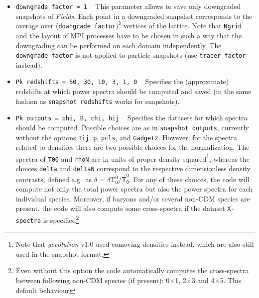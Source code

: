 \documentclass[a4paper,10pt]{article}
\begin{document}
\begin{itemize}
 If the particle template is a crystal only certain choices of \texttt{tracer factor} will result in a crystal structure for the
 \textit{tracer particles}. These are 1, 2, 8, 16, 64 for the simple cubic templates, 1, 4, 8, 32 for the face-centered cubic one,
 and 1, 2, 4, 16 for the body-centered cubic one.
 \item[] \hspace{-25pt}\texttt{downgrade factor = 1} ~ This parameter allows to save only downgraded snapshots of \textit{Fields}. Each
 point in a downgraded snapshot corresponds to the average over (\texttt{downgrade factor}$)^\mathsf{3}$ vertices of the lattice. Note that
 \texttt{Ngrid} and the layout of MPI processes have to be chosen in such a way that the downgrading can be performed on each domain
 independently. The \texttt{downgrade factor} is not applied to particle snapshots (use \texttt{tracer factor} instead).
 \item[] \hspace{-25pt}\texttt{Pk redshifts = 50, 30, 10, 3, 1, 0} ~ Specifies the (approximate) redshifts at which power spectra should be
 computed and saved (in the same fashion as \texttt{snapshot redshifts} works for snapshots).
 \item[] \hspace{-25pt}\texttt{Pk outputs = phi, B, chi, hij} ~ Specifies the datasets for which spectra should be computed. Possible
 choices are as in \texttt{snapshot outputs}, currently without the options \texttt{Tij}, \texttt{p}, \texttt{pcls}, and \texttt{Gadget2}.
 However, for the spectra related to densities there are two possible choices for the normalization. The spectra of \texttt{T00} and
 \texttt{rhoN} are in units of proper density squared\footnote{Note that \textit{gevolution} v1.0 used comoving densities instead, which are
 also still used in the snapshot format.}, whereas the choices \texttt{delta} and \texttt{deltaN} correspond to the respective dimensionless
 density contrasts, defined e.g.\ as $\mathsf{\delta}$ = $\mathsf{\delta}$T$^\mathsf{0}_\mathsf{0}$/$\mathsf{\bar{T}^0_0}$. For any of these
 choices, the code will compute not only the total power spectra but also the power spectra for each individual species. Moreover, if
 baryons and/or several non-CDM species are present, the code will 
also compute some cross-spectra if the dataset \texttt{X-spectra} is specified\footnote{Even without this option the code automatically
computes the cross-spectra between following non-CDM species (if present): 0$\times$1, 2$\times$3 and 4$\times$5. This default behaviour
}
\end{itemize}
\end{document}
